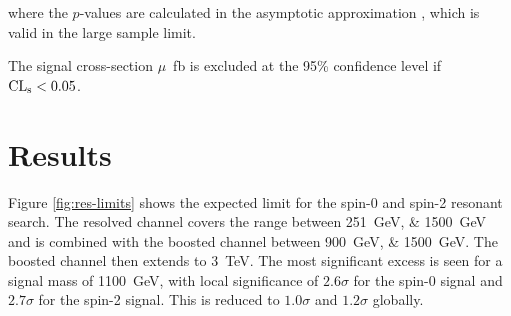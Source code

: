 where the $p$-values are calculated in the asymptotic approximation
\cite{Cowan11}, which is valid in the large sample limit.

The signal cross-section {$\mu$}~\si{\femto\barn} is excluded at the 95\% confidence level if $\text{CL}\textsubscript{s} < 0.05$.

\FloatBarrier
\clearpage
\section{Results}
Figure \ref{fig:res-limits} shows the expected limit for the spin-0 and spin-2 resonant search. The 
resolved channel covers the range between \SIlist{251;1500}{\GeV} and is combined with the boosted channel between \SIlist{900;1500}{\GeV}. The boosted channel then extends to \SI{3}{\TeV}. The most significant excess is seen 
for a signal mass of \SI{1100}{\GeV}, with local significance of $2.6\sigma$ for the spin-0 signal and 
$2.7\sigma$ for the spin-2 signal. This is reduced to $1.0\sigma$ and $1.2\sigma$ globally. 


